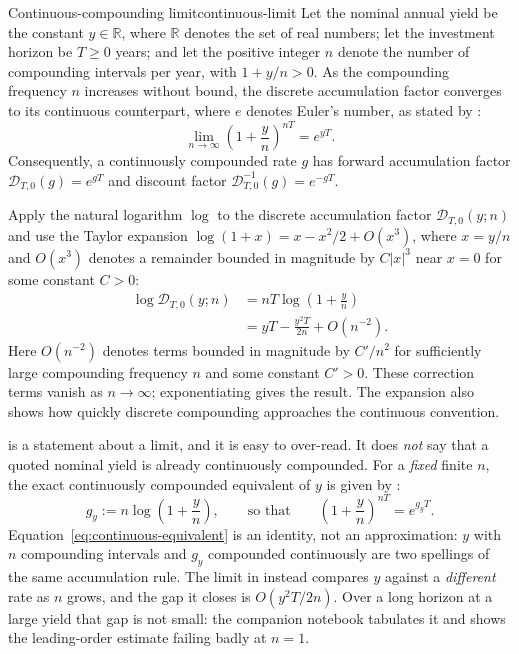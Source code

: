 \documentclass[11pt]{article}
\newcommand{\R}{\mathbb{R}}
\newcommand{\D}{\mathcal{D}}
\begin{document}
\begin{theorem}{Continuous-compounding limit}{continuous-limit}
Let the nominal annual yield be the constant $y\in\R$, where $\R$ denotes the set of real numbers; let the investment horizon be $T\geq 0$ years; and let the positive integer $n$ denote the number of compounding intervals per year, with $1+y/n>0$. As the compounding frequency $n$ increases without bound, the discrete accumulation factor converges to its continuous counterpart, where $e$ denotes Euler's number, as stated by :
\begin{equation}
  \label{eq:continuous-limit-equation}
  \lim_{n\to\infty}\left(1+\frac{y}{n}\right)^{nT}=e^{yT}.
\end{equation}
Consequently, a continuously compounded rate $g$ has forward accumulation factor $\D_{T,0}(g)=e^{gT}$ and discount factor $\D_{T,0}^{-1}(g)=e^{-gT}$.
\end{theorem}

\begin{derivation}
Apply the natural logarithm $\log$ to the discrete accumulation factor $\D_{T,0}(y;n)$ and use the Taylor expansion $\log(1+x)=x-x^2/2+O(x^3)$, where $x=y/n$ and $O(x^3)$ denotes a remainder bounded in magnitude by $C\lvert x\rvert^3$ near $x=0$ for some constant $C>0$:
\begin{align*}
  \log \D_{T,0}(y;n)
  &=nT\log\left(1+\frac{y}{n}\right) \\
  &=yT-\frac{y^2T}{2n}+O(n^{-2}).
\end{align*}
Here $O(n^{-2})$ denotes terms bounded in magnitude by $C'/n^2$ for sufficiently large compounding frequency $n$ and some constant $C'>0$. These correction terms vanish as $n\to\infty$; exponentiating gives the result. The expansion also shows how quickly discrete compounding approaches the continuous convention.
\end{derivation}

 is a statement about a limit, and it is easy to over-read. It does \emph{not} say that a quoted nominal yield is already continuously compounded. For a \emph{fixed} finite $n$, the exact continuously compounded equivalent of $y$ is given by :
\begin{equation}
  \label{eq:continuous-equivalent}
  g_y:=n\log\left(1+\frac{y}{n}\right),
  \qquad\text{so that}\qquad
  \left(1+\frac{y}{n}\right)^{nT}=e^{g_yT}.
\end{equation}
Equation~\eqref{eq:continuous-equivalent} is an identity, not an approximation: $y$ with $n$ compounding intervals and $g_y$ compounded continuously are two spellings of the same accumulation rule. The limit in  instead compares $y$ against a \emph{different} rate as $n$ grows, and the gap it closes is $O(y^2T/2n)$. Over a long horizon at a large yield that gap is not small: the companion notebook tabulates it and shows the leading-order estimate failing badly at $n=1$.
\end{document}
